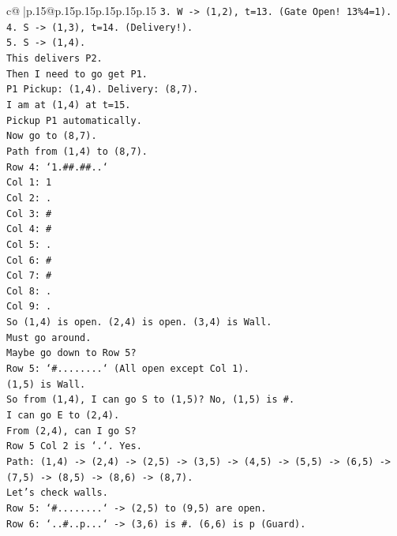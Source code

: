 \documentclass{article}
\begin{document}
{\begin{supertabular}{c@{$\;$}|p{.15\linewidth}@{}p{.15\linewidth}p{.15\linewidth}p{.15\linewidth}p{.15\linewidth}p{.15\linewidth}}
{{{\texttt{3. W {-}> (1,2), t=13. (Gate Open! 13\%4=1).} \\
\texttt{4. S {-}> (1,3), t=14. (Delivery!).} \\
\texttt{5. S {-}> (1,4).} \\
\texttt{This delivers P2.} \\
\texttt{Then I need to go get P1.} \\
\texttt{P1 Pickup: (1,4). Delivery: (8,7).} \\
\texttt{I am at (1,4) at t=15.} \\
\texttt{Pickup P1 automatically.} \\
\texttt{Now go to (8,7).} \\
\texttt{Path from (1,4) to (8,7).} \\
\texttt{Row 4: `1.\#\#.\#\#..`} \\
\texttt{Col 1: 1} \\
\texttt{Col 2: .} \\
\texttt{Col 3: \#} \\
\texttt{Col 4: \#} \\
\texttt{Col 5: .} \\
\texttt{Col 6: \#} \\
\texttt{Col 7: \#} \\
\texttt{Col 8: .} \\
\texttt{Col 9: .} \\
\texttt{So (1,4) is open. (2,4) is open. (3,4) is Wall.} \\
\texttt{Must go around.} \\
\texttt{Maybe go down to Row 5?} \\
\texttt{Row 5: `\#........` (All open except Col 1).} \\
\texttt{(1,5) is Wall.} \\
\texttt{So from (1,4), I can go S to (1,5)? No, (1,5) is \#.} \\
\texttt{I can go E to (2,4).} \\
\texttt{From (2,4), can I go S?} \\
\texttt{Row 5 Col 2 is `.`. Yes.} \\
\texttt{Path: (1,4) {-}> (2,4) {-}> (2,5) {-}> (3,5) {-}> (4,5) {-}> (5,5) {-}> (6,5) {-}> (7,5) {-}> (8,5) {-}> (8,6) {-}> (8,7).} \\
\texttt{Let's check walls.} \\
\texttt{Row 5: `\#........` {-}> (2,5) to (9,5) are open.} \\
\texttt{Row 6: `..\#..p...` {-}> (3,6) is \#. (6,6) is p (Guard).} \\
}}}
\end{supertabular}}
\end{document}
